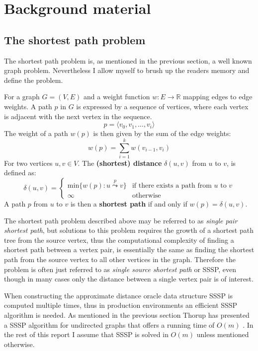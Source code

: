 \chapter{Background material}

\section{The shortest path problem}
The shortest path problem is, as mentioned in the previous section, a well
known graph problem. Nevertheless I allow myself to brush up the readers
memory and define the problem.
\begin{defn}
    For a graph $G = (V, E)$ and a weight function $w : E \rightarrow
    \mathbb{R}$ mapping edges to edge weights.
    A path $p$ in $G$ is expressed by a sequence of vertices, where each
    vertex is adjacent with the next vertex in the sequence.
    \[
        p = \langle v_0, v_1, \dots ,v_i \rangle
    \]
    The weight of a path $w(p)$ is then given by the sum of the edge weights:
    \[
        w(p) = \sum\limits_{i=1}^k w(v_{i-1},v_{i})
    \]
    For two vertices $u,v \in V$. The \textbf{(shortest) distance}
    $\delta(u,v)$ from $u$ to $v$, is defined as:
    \[
        \delta(u,v) =
            \begin{cases}
                \text{min} \{ w(p): u \overset{p}{\leadsto} v \}
                & \text{if there exists a path from $u$ to $v$} \\
                \infty
                & \text{otherwise }
            \end{cases}
    \]
    A path $p$ from $u$ to $v$ is then a \textbf{shortest path} if and only if
    $w(p) = \delta(u,v)$.
\end{defn}
The shortest path problem described above may be referred to as \emph{single
pair shortest path}, but solutions to this problem requires the growth of
a shortest path tree from the source vertex, thus the computational
complexity of finding a shortest path between a vertex pair, is essentially the
same as finding the shortest path from the source vertex to all other vertices
in the graph.
Therefore the problem is often just referred to as \emph{single source
shortest path} or SSSP, even though in many cases only the distance
between a single vertex pair is of interest.

When constructing the approximate distance oracle data structure SSSP is
computed multiple times, thus in production environments an efficient SSSP
algorithm is needed. As mentioned in the previous section Thorup has presented
a SSSP algorithm for undirected graphs that offers a running time of $O(m)$
\cite{thorupsssp}. In the rest of this report I assume that SSSP is solved in
$O(m)$ unless mentioned otherwise.

